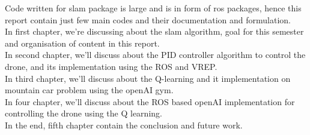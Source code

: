 Code written for slam package is large and is in form of ros packages, hence this report contain just few main codes and their documentation and formulation.
\\
In first chapter, we're discussing about the slam algorithm, goal for this semester and organisation of content in this report.
\\
In second chapter, we'll discuss about the PID controller algorithm to control the drone, and its implementation using the ROS and VREP.
\\
In third chapter, we'll discuss about the Q-learning and it implementation on mountain car problem using the openAI gym.
\\
In four chapter, we'll discuss about the ROS based openAI implementation for controlling the drone using the Q learning.
\\
In the end, fifth chapter contain the conclusion and future work.


